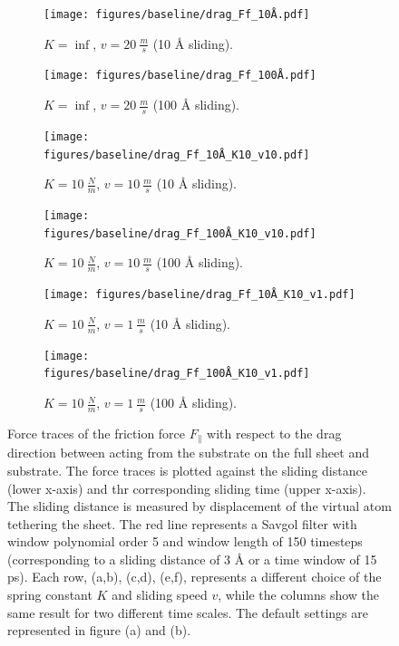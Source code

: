 %
%
%
%

\begin{figure}[H]
  \centering
  \begin{subfigure}[t]{0.49\textwidth}
      \centering
      \texttt{[image: figures/baseline/drag\_Ff\_10Å.pdf]}
      \caption{$K = \inf$, $v = \SI{20}{\frac{m}{s}}$ (10 Å sliding).}
      \label{fig:drag_Ff_10}
  \end{subfigure}
  \hfill
  \begin{subfigure}[t]{0.49\textwidth}
      \centering
      \texttt{[image: figures/baseline/drag\_Ff\_100Å.pdf]}
      \caption{$K = \inf$, $v = \SI{20}{\frac{m}{s}}$ (100 Å sliding).}
      \label{fig:drag_Ff_100}
    \end{subfigure}
    \hfill
    \begin{subfigure}[t]{0.49\textwidth}
      \centering
      \texttt{[image: figures/baseline/drag\_Ff\_10Å\_K10\_v10.pdf]}
      \caption{$K = \SI{10}{\frac{N}{m}}$, $v = \SI{10}{\frac{m}{s}}$ (10 Å sliding).}
      \label{fig:drag_Ff_10_K10_v10}
    \end{subfigure}
    \hfill
    \begin{subfigure}[t]{0.49\textwidth}
      \centering
      \texttt{[image: figures/baseline/drag\_Ff\_100Å\_K10\_v10.pdf]}
      \caption{$K = \SI{10}{\frac{N}{m}}$, $v = \SI{10}{\frac{m}{s}}$ (100 Å sliding).}
      \label{fig:drag_Ff_100_K10_v10}
  \end{subfigure}
  \hfill
    \begin{subfigure}[t]{0.49\textwidth}
      \centering
      \texttt{[image: figures/baseline/drag\_Ff\_10Å\_K10\_v1.pdf]}
      \caption{$K = \SI{10}{\frac{N}{m}}$, $v = \SI{1}{\frac{m}{s}}$ (10 Å sliding).}
      \label{fig:drag_Ff_10_K10_v1}
    \end{subfigure}
    \hfill
    \begin{subfigure}[t]{0.49\textwidth}
      \centering
      \texttt{[image: figures/baseline/drag\_Ff\_100Å\_K10\_v1.pdf]}
      \caption{$K = \SI{10}{\frac{N}{m}}$, $v = \SI{1}{\frac{m}{s}}$ (100 Å sliding).}
      \label{fig:drag_Ff_100_K10_v1}
  \end{subfigure}
  \hfill
     \caption{Force traces of the friction force $F_\parallel$ with respect to the drag direction between acting from the substrate on the full sheet and substrate. The force traces is plotted against the sliding distance (lower x-axis) and thr corresponding sliding time (upper x-axis). The sliding distance is measured by displacement of the virtual atom tethering the sheet. The red line represents a Savgol filter with window polynomial order 5 and window length of 150 timesteps (corresponding to a sliding distance of 3 Å or a time window of 15 ps). Each row, (a,b), (c,d), (e,f), represents a different choice of the spring constant $K$ and sliding speed $v$, while the columns show the same result for two different time scales. The default settings are represented in figure (a) and (b).}
     \label{fig:drag_Ff}
\end{figure}

